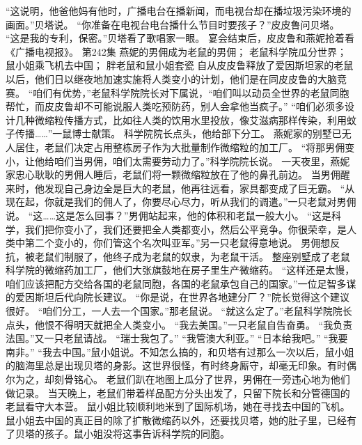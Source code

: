 \documentclass[a4paper,12pt,UTF8,twoside]{ctexbook}
\begin{document}
        “这说明，他爸他妈有他时，广播电台在播新闻，而电视台却在播垃圾污染环境的画面。”贝塔说。  
        “你准备在电视台电台播什么节目时要孩子？”皮皮鲁问贝塔。  
        “这是我的专利，保密。”贝塔看了歌唱家一眼。  
        宴会结束后，皮皮鲁和燕妮抢着看《广播电视报》。          第242集  
        燕妮的男佣成为老鼠的男佣；  
        老鼠科学院瓜分世界；  
        鼠小姐乘飞机去中国；  
        胖老鼠和鼠小姐套瓷    
        自从皮皮鲁释放了爱因斯坦家的老鼠以后，他们日以继夜地加速实施将人类变小的计划，他们是在同皮皮鲁的大脑竞赛。  
        “咱们有优势，”老鼠科学院院长对下属说，“咱们叫以动员全世界的老鼠同胞帮忙，而皮皮鲁却不可能说服人类吃预防药，别人会拿他当疯子。”  
        “咱们必须多设计几种微缩粒传播方式，比如往人类的饮用水里投放，像艾滋病那样传染，利用蚊子传播……”一鼠博士献策。  
        科学院院长点头，他给部下分工。  
        燕妮家的别墅已无人居住，老鼠们决定占用整栋房子作为大批量制作微缩粒的加工厂。  
        “将那男佣变小，让他给咱们当男佣，咱们太需要劳动力了。”科学院院长说。  
        一天夜里，燕妮家忠心耿耿的男佣人睡后，老鼠们将一颗微缩粒放在了他的鼻孔前边。  
        当男佣醒来时，他发现自己身边全是巨大的老鼠，他再往远看，家具都变成了巨无霸。  
        “从现在起，你就是我们的佣人了，你要尽心尽力，听从我们的调遣。”一只老鼠对男佣说。  
        “这……这是怎么回事？”男佣站起来，他的体积和老鼠一般大小。  
        “这是科学，我们把你变小了，我们还要把全人类都变小，然后公平竞争。你很荣幸，是人类中第二个变小的，你们管这个名次叫亚军。”另一只老鼠得意地说。  
        男佣想反抗，被老鼠们制服了，他终子成为老鼠的奴隶，为老鼠干活。  
        整座别墅成了老鼠科学院的微缩药加工厂，他们大张旗鼓地在房子里生产微缩药。  
        “这样还是太慢，咱们应该把配方交给各国的老鼠同胞，各国的老鼠承包自己的国家。”一位足智多谋的爱因斯坦后代向院长建议。  
        “你是说，在世界各地建分厂？”院长觉得这个建议很好。        
        “咱们分工，一人去一个国家。”那老鼠说。  
        “就这么定了。”老鼠科学院院长点头，他恨不得明天就把全人类变小。  
        “我去美国。”一只老鼠自告奋勇。  
        “我负责法国。”又一只老鼠请战。  
        “瑞士我包了。”  
        “我管澳大利亚。”  
        “日本给我吧。”  
        “我要南非。”  
        “我去中国。”鼠小姐说。不知怎么搞的，和贝塔有过那么一次以后，鼠小姐的脑海里总是出现贝塔的身影。这世界很怪，有时终身厮守，却毫无印象。有时偶尔为之，却刻骨铭心。  
        老鼠们趴在地图上瓜分了世界，男佣在一旁违心地为他们做记录。  
        当天晚上，老鼠们带着样品配方分头出发了，只留下院长和分管德国的老鼠看守大本营。  
        鼠小姐比较顺利地米到了国际机场，她在寻找去中国的飞机。  
        鼠小姐去中国的真正目的除了扩散微缩药以外，还要找贝塔，她的肚子里，已经有了贝塔的孩子。鼠小姐没将这事告诉科学院的同胞。  
\end{document}

